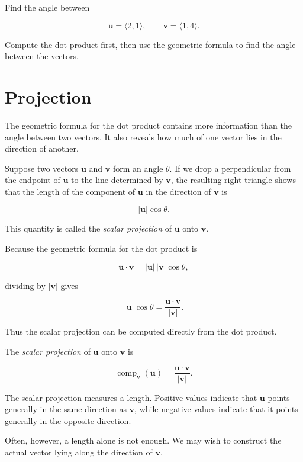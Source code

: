 \begin{practicenow}
Find the angle between

\[
\mathbf{u}
=
\langle 2,1\rangle,
\qquad
\mathbf{v}
=
\langle 1,4\rangle.
\]

Compute the dot product first, then use the geometric formula to find the
angle between the vectors.
\end{practicenow}

\section{Projection}

The geometric formula for the dot product contains more information than
the angle between two vectors. It also reveals how much of one vector
lies in the direction of another.

Suppose two vectors $\mathbf{u}$ and $\mathbf{v}$ form an angle
$\theta$. If we drop a perpendicular from the endpoint of $\mathbf{u}$ to
the line determined by $\mathbf{v}$, the resulting right triangle shows
that the length of the component of $\mathbf{u}$ in the direction of
$\mathbf{v}$ is

\[
|\mathbf{u}|\cos\theta.
\]

This quantity is called the \emph{scalar projection} of
$\mathbf{u}$ onto $\mathbf{v}$.

Because the geometric formula for the dot product is

\[
\mathbf{u}\cdot\mathbf{v}
=
|\mathbf{u}|\,|\mathbf{v}|\cos\theta,
\]

dividing by $|\mathbf{v}|$ gives

\[
|\mathbf{u}|\cos\theta
=
\frac{\mathbf{u}\cdot\mathbf{v}}
     {|\mathbf{v}|}.
\]

Thus the scalar projection can be computed directly from the dot product.

\begin{definition}
The \emph{scalar projection} of $\mathbf{u}$ onto $\mathbf{v}$ is

\[
\operatorname{comp}_{\mathbf{v}}(\mathbf{u})
=
\frac{\mathbf{u}\cdot\mathbf{v}}
     {|\mathbf{v}|}.
\]
\end{definition}

The scalar projection measures a length. Positive values indicate that
$\mathbf{u}$ points generally in the same direction as $\mathbf{v}$,
while negative values indicate that it points generally in the opposite
direction.

Often, however, a length alone is not enough. We may wish to construct
the actual vector lying along the direction of $\mathbf{v}$.

